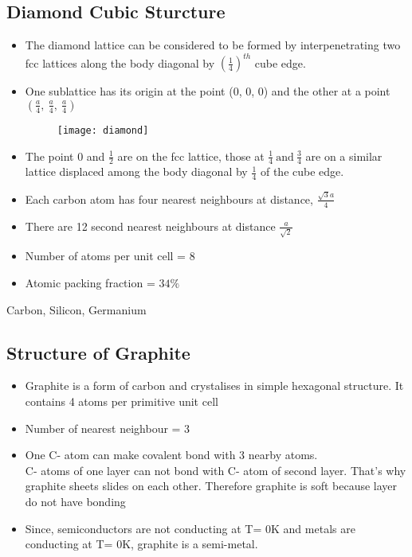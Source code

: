 \subsection{Diamond Cubic Sturcture}
\begin{itemize}
	\item The diamond lattice can be considered to be formed by interpenetrating two fcc lattices along the body diagonal by $(\frac{1}{4})^{th}$ cube edge.
	\item One sublattice has its origin at the point (0, 0, 0) and the other at a point $(\frac{a}{4},\ \frac{a}{4}, \ \frac{a}{4})$
	\begin{figure}[h]
		\texttt{[image: diamond]}	
	\end{figure}
	\item The point 0 and $\frac{1}{2}$ are on the fcc lattice, those at $\frac{1}{4} \ \text{and}\  \frac{3}{4}$ are on a similar lattice displaced among the body diagonal by $\frac{1}{4}$ of the cube edge.
	\item Each carbon atom has four nearest neighbours at distance, $\frac{\sqrt{3}a}{4}$
	\item There are 12 second nearest neighbours at distance $\frac{a}{\sqrt{2}}$
	\item Number of atoms per unit cell = 8
	\item Atomic packing fraction = $34 \%$
\end{itemize}
\begin{example}
	Carbon, Silicon, Germanium
\end{example}
\subsection{Structure of Graphite}
\begin{itemize}
	\item Graphite is a form of carbon and crystalises in simple hexagonal structure. It contains 4 atoms per primitive unit cell
	\item Number of nearest neighbour = 3
	\item One C- atom can make covalent bond with 3 nearby atoms.\\
	C- atoms of one layer can not bond with C- atom of second layer. That's why graphite sheets slides on each other. Therefore graphite is soft because layer do not have bonding
	\item Since, semiconductors are not conducting at T= 0K and metals are conducting at T= 0K, graphite is a semi-metal.
\end{itemize}	



